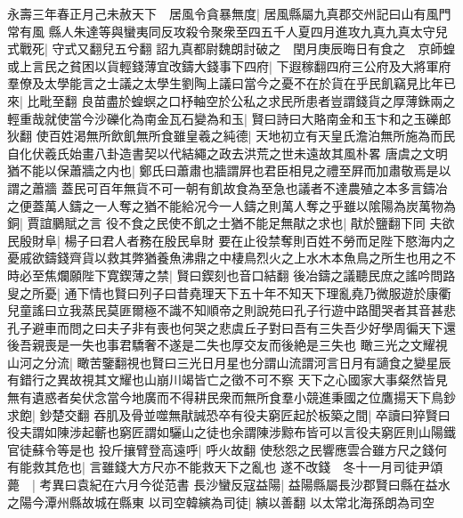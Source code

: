 永壽三年春正月己未赦天下　居風令貪暴無度|{
	居風縣屬九真郡交州記曰山有風門常有風}
縣人朱達等與蠻夷同反攻殺令聚衆至四五千人夏四月進攻九真九真太守兒式戰死|{
	守式又翻兒五兮翻}
詔九真都尉魏朗討破之　閏月庚辰晦日有食之　京師蝗　或上言民之貧困以貨輕錢薄宜改鑄大錢事下四府|{
	下遐稼翻四府三公府及大將軍府}
羣僚及太學能言之士議之太學生劉陶上議曰當今之憂不在於貨在乎民飢竊見比年已來|{
	比毗至翻}
良苗盡於蝗螟之口杼軸空於公私之求民所患者豈謂錢貨之厚薄銖兩之輕重哉就使當今沙礫化為南金瓦石變為和玉|{
	賢曰詩曰大賂南金和玉卞和之玉礫郎狄翻}
使百姓渇無所飲飢無所食雖皇羲之純德|{
	天地初立有天皇氏澹泊無所施為而民自化伏羲氏始畫八卦造書契以代結繩之政去洪荒之世未遠故其風朴畧}
唐虞之文明猶不能以保蕭牆之内也|{
	鄭氏曰蕭肅也牆謂屛也君臣相見之禮至屛而加肅敬焉是以謂之蕭牆}
蓋民可百年無貨不可一朝有飢故食為至急也議者不達農殖之本多言鑄冶之便蓋萬人鑄之一人奪之猶不能給况今一人鑄之則萬人奪之乎雖以隂陽為炭萬物為銅|{
	賈誼鵩賦之言}
役不食之民使不飢之士猶不能足無猒之求也|{
	猒於鹽翻下同}
夫欲民殷財阜|{
	楊子曰君人者務在殷民阜財}
要在止役禁奪則百姓不勞而足陛下愍海内之憂戚欲鑄錢齊貨以救其弊猶養魚沸鼎之中棲鳥烈火之上水木本魚鳥之所生也用之不時必至焦爛願陛下寛鍥薄之禁|{
	賢曰鍥刻也音口結翻}
後冶鑄之議聽民庶之謠吟問路叟之所憂|{
	通下情也賢曰列子曰昔堯理天下五十年不知天下理亂堯乃微服遊於康衢兒童謠曰立我蒸民莫匪爾極不識不知順帝之則說苑曰孔子行遊中路聞哭者其音甚悲孔子避車而問之曰夫子非有喪也何哭之悲虞丘子對曰吾有三失吾少好學周徧天下還後吾親喪是一失也事君驕奢不遂是二失也厚交友而後絶是三失也}
瞰三光之文耀視山河之分流|{
	瞰苦鑒翻視也賢曰三光日月星也分謂山流謂河言日月有讁食之變星辰有錯行之異故視其文耀也山崩川竭皆亡之徵不可不察}
天下之心國家大事粲然皆見無有遺惑者矣伏念當今地廣而不得耕民衆而無所食羣小競進秉國之位鷹揚天下鳥鈔求飽|{
	鈔楚交翻}
吞肌及骨並噬無猒誠恐卒有役夫窮匠起於板築之間|{
	卒讀曰猝賢曰役夫謂如陳涉起蘄也窮匠謂如驪山之徒也余謂陳涉黥布皆可以言役夫窮匠則山陽鐵官徒蘇令等是也}
投斤攘臂登高遠呼|{
	呼火故翻}
使愁怨之民響應雲合雖方尺之錢何有能救其危也|{
	言雖錢大方尺亦不能救天下之亂也}
遂不改錢　冬十一月司徒尹頌薨　|{
	考異曰袁紀在六月今從范書}
長沙蠻反寇益陽|{
	益陽縣屬長沙郡賢曰縣在益水之陽今潭州縣故城在縣東}
以司空韓縯為司徒|{
	縯以善翻}
以太常北海孫朗為司空

